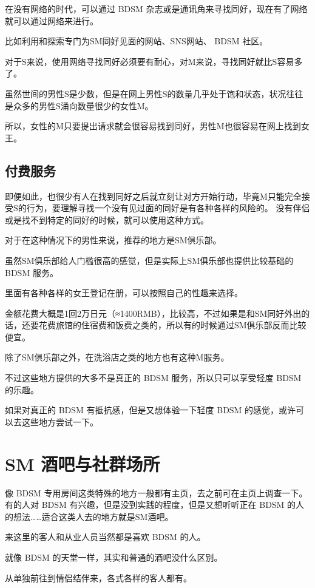 \documentclass[12pt,UTF8]{ctexbook}
\begin{document}
在没有网络的时代，可以通过 BDSM 杂志或是通讯角来寻找同好，现在有了网络就可以通过网络来进行。

比如利用和探索专门为SM同好见面的网站、SNS网站、 BDSM 社区。

对于S来说，使用网络寻找同好必须要有耐心，对M来说，寻找同好就比S容易多了。

虽然世间的男性S是少数，但是在网上男性S的数量几乎处于饱和状态，状况往往是众多的男性S涌向数量很少的女性M。

所以，女性的M只要提出请求就会很容易找到同好，男性M也很容易在网上找到女王。

\subsection{付费服务}

即便如此，也很少有人在找到同好之后就立刻让对方开始行动，毕竟M只能完全接受S的行为，要理解寻找一个没有见过面的同好是有各种各样的风险的。 没有伴侣或是找不到特定的同好的时候，就可以使用这种方式。

对于在这种情况下的男性来说，推荐的地方是SM俱乐部。

虽然SM俱乐部给人门槛很高的感觉，但是实际上SM俱乐部也提供比较基础的 BDSM 服务。

里面有各种各样的女王登记在册，可以按照自己的性趣来选择。

金额花费大概是1回2万日元（≈1400RMB），比较高，不过如果是和SM同好外出的话，还要花费旅馆的住宿费和饭费之类的，所以有的时候通过SM俱乐部反而比较便宜。

除了SM俱乐部之外，在洗浴店之类的地方也有这种M服务。

不过这些地方提供的大多不是真正的 BDSM 服务，所以只可以享受轻度 BDSM 的乐趣。

如果对真正的 BDSM 有抵抗感，但是又想体验一下轻度 BDSM 的感觉，或许可以去这些地方尝试一下。

\section{SM 酒吧与社群场所}

像 BDSM 专用房间这类特殊的地方一般都有主页，去之前可在主页上调查一下。有的人对 BDSM 有兴趣，但是没到实践的程度，但是又想听听正在 BDSM 的人的想法……适合这类人去的地方就是SM酒吧。

来这里的客人和从业人员当然都是喜欢 BDSM 的人。

就像 BDSM 的天堂一样，其实和普通的酒吧没什么区别。

从单独前往到情侣结伴来，各式各样的客人都有。
\end{document}
